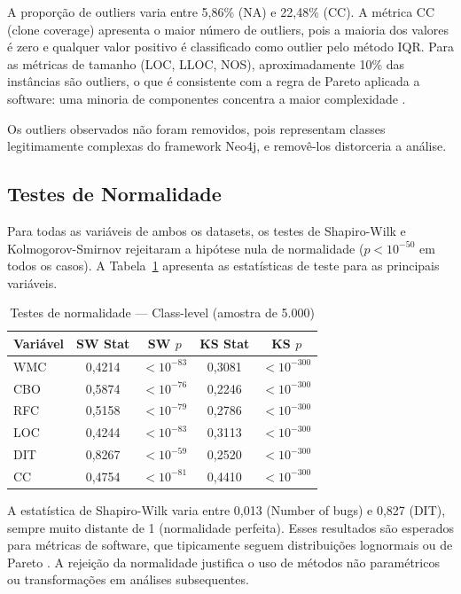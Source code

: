 \documentclass[12pt]{article}
\begin{document}
A proporção de outliers varia entre 5,86\% (NA) e 22,48\% (CC). A métrica CC (clone coverage) apresenta o maior número de outliers, pois a maioria dos valores é zero e qualquer valor positivo é classificado como outlier pelo método IQR. Para as métricas de tamanho (LOC, LLOC, NOS), aproximadamente 10\% das instâncias são outliers, o que é consistente com a regra de Pareto aplicada a software: uma minoria de componentes concentra a maior complexidade \cite{nagappan2006}.

Os outliers observados não foram removidos, pois representam classes legitimamente complexas do framework Neo4j, e removê-los distorceria a análise.

\subsection{Testes de Normalidade}

Para todas as variáveis de ambos os datasets, os testes de Shapiro-Wilk e Kolmogorov-Smirnov rejeitaram a hipótese nula de normalidade ($p < 10^{-50}$ em todos os casos). A Tabela~\ref{tab:normalidade} apresenta as estatísticas de teste para as principais variáveis.

\begin{table}[H]
\centering
\caption{Testes de normalidade --- Class-level (amostra de 5.000)}
\label{tab:normalidade}
\small
\begin{tabular}{lcccc}
\toprule
\textbf{Variável} & \textbf{SW Stat} & \textbf{SW $p$} & \textbf{KS Stat} & \textbf{KS $p$} \\
\midrule
WMC   & 0,4214 & $< 10^{-83}$ & 0,3081 & $< 10^{-300}$ \\
CBO   & 0,5874 & $< 10^{-76}$ & 0,2246 & $< 10^{-300}$ \\
RFC   & 0,5158 & $< 10^{-79}$ & 0,2786 & $< 10^{-300}$ \\
LOC   & 0,4244 & $< 10^{-83}$ & 0,3113 & $< 10^{-300}$ \\
DIT   & 0,8267 & $< 10^{-59}$ & 0,2520 & $< 10^{-300}$ \\
CC    & 0,4754 & $< 10^{-81}$ & 0,4410 & $< 10^{-300}$ \\
\bottomrule
\end{tabular}
\end{table}

A estatística de Shapiro-Wilk \cite{shapiro1965} varia entre 0,013 (Number of bugs) e 0,827 (DIT), sempre muito distante de 1 (normalidade perfeita). Esses resultados são esperados para métricas de software, que tipicamente seguem distribuições lognormais ou de Pareto \cite{radjenovic2013}. A rejeição da normalidade justifica o uso de métodos não paramétricos ou transformações em análises subsequentes.
\end{document}
